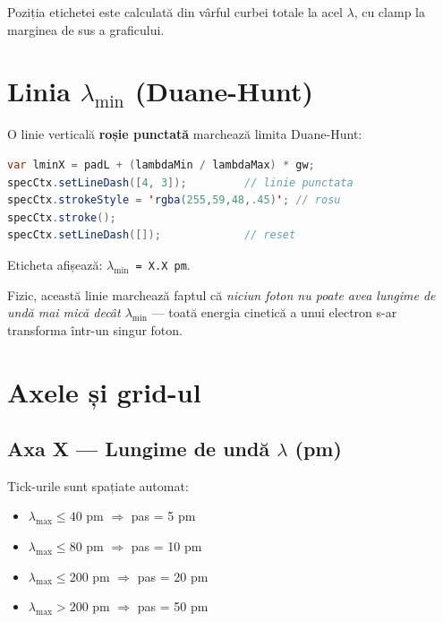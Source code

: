 \documentclass[12pt,a4paper]{article}
\begin{document}
Poziția etichetei este calculată din vârful curbei totale la acel $\lambda$, cu clamp la marginea de sus a graficului.


\section{Linia $\lambda_{\min}$ (Duane-Hunt)}

O linie verticală \textcolor{redline}{\textbf{roșie punctată}} marchează limita Duane-Hunt:

\begin{lstlisting}[language=Java]
var lminX = padL + (lambdaMin / lambdaMax) * gw;
specCtx.setLineDash([4, 3]);         // linie punctata
specCtx.strokeStyle = 'rgba(255,59,48,.45)'; // rosu
specCtx.stroke();
specCtx.setLineDash([]);             // reset
\end{lstlisting}

Eticheta afișează: \textcolor{redline}{\texttt{$\lambda_{\min}$ = X.X pm}}.

Fizic, această linie marchează faptul că \emph{niciun foton nu poate avea lungime de undă mai mică decât $\lambda_{\min}$} — toată energia cinetică a unui electron s-ar transforma într-un singur foton.


\section{Axele și grid-ul}

\subsection{Axa X — Lungime de undă $\lambda$ (pm)}

Tick-urile sunt spațiate automat:
\begin{itemize}[leftmargin=2em]
    \item $\lambda_{\max} \leq 40$ pm $\Rightarrow$ pas = 5 pm
    \item $\lambda_{\max} \leq 80$ pm $\Rightarrow$ pas = 10 pm
    \item $\lambda_{\max} \leq 200$ pm $\Rightarrow$ pas = 20 pm
    \item $\lambda_{\max} > 200$ pm $\Rightarrow$ pas = 50 pm
\end{itemize}
\end{document}
